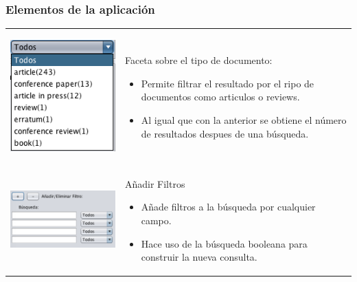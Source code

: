 \documentclass{beamer} %
\begin{document}
\begin{frame}
	\frametitle{Elementos de la aplicación}
	\begin{tabular}{cl}
		\begin{minipage}{0.33\textwidth}	
			\begin{center}
					\includegraphics[scale=0.35]{Img/Img8.png}
			\end{center}
		\end{minipage}
 	 & 
		\begin{minipage}[t]{0.65\textwidth}
		Faceta sobre el tipo de documento:
    	\begin{itemize}
    		\item Permite filtrar el resultado por el ripo de documentos como articulos o reviews.
    		\item Al igual que con la anterior se obtiene el número de resultados despues de una búsqueda.
    	\end{itemize}
 	 \end{minipage}\\
		\begin{minipage}{0.33\textwidth}	
			\begin{center}
					\includegraphics[scale=0.35]{Img/Img9.png}
			\end{center}		
		\end{minipage}  
	& 
	\begin{minipage}[t]{0.6\textwidth}
	Añadir Filtros
    	\begin{itemize}
    		\item Añade filtros a la búsqueda por cualquier campo.
    		\item Hace uso de la búsqueda booleana para construir la nueva consulta.
    	\end{itemize}
 	 \end{minipage}\\
	\end{tabular} 
\end{frame}
\end{document}
